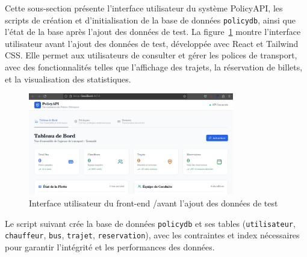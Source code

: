 \documentclass[12pt,a4paper]{article}
\begin{document}
    Cette sous-section présente l'interface utilisateur du système PolicyAPI, les scripts de création et d'initialisation de la base de données \texttt{policydb}, ainsi que l'état de la base après l'ajout des données de test. La figure~\ref{fig:frontend_policybd} montre l'interface utilisateur avant l'ajout des données de test, développée avec React et Tailwind CSS. Elle permet aux utilisateurs de consulter et gérer les polices de transport, avec des fonctionnalités telles que l'affichage des trajets, la réservation de billets, et la visualisation des statistiques.

    \begin{figure}[H]
        \centering
        \includegraphics[width=0.8\textwidth]{image-avant-bd.jpeg}
        \caption{Interface utilisateur du front-end /avant l'ajout des données de test}
        \label{fig:frontend_policybd}
    \end{figure}

    Le script suivant crée la base de données \texttt{policydb} et ses tables (\texttt{utilisateur}, \texttt{chauffeur}, \texttt{bus}, \texttt{trajet}, \texttt{reservation}), avec les contraintes et index nécessaires pour garantir l'intégrité et les performances des données.
\end{document}
